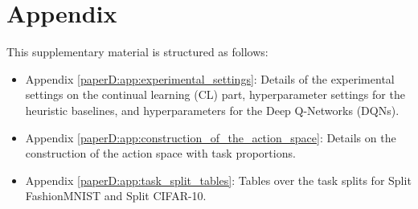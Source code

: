 
\section*{Appendix}

This supplementary material is structured as follows:
\begin{itemize}
    \item Appendix \ref{paperD:app:experimental_settings}: Details of the experimental settings on the continual learning (CL) part, hyperparameter settings for the heuristic baselines, and hyperparameters for the Deep Q-Networks (DQNs). 
    
    \item Appendix \ref{paperD:app:construction_of_the_action_space}: Details on the construction of the action space with task proportions. 
    
    \item Appendix \ref{paperD:app:task_split_tables}: Tables over the task splits for Split FashionMNIST and Split CIFAR-10.  
\end{itemize}





\newpage


%

\begin{table}[h]
\centering
\label{tab:testing}
\end{table}